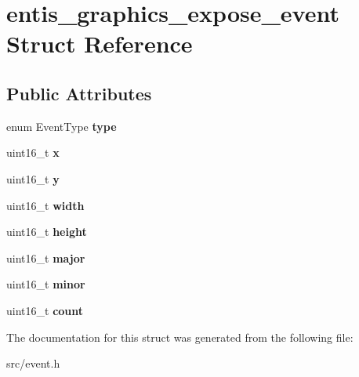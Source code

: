 \hypertarget{structentis__graphics__expose__event}{}\section{entis\+\_\+graphics\+\_\+expose\+\_\+event Struct Reference}
\label{structentis__graphics__expose__event}
\subsection*{Public Attributes}
\begin{DoxyCompactItemize}
\item 
\mbox{\label{structentis__graphics__expose__event_a77150777a48328b11a58cdccb8aee3ad}} 
enum Event\+Type {\bfseries type}
\item 
\mbox{\label{structentis__graphics__expose__event_a64d5a499a952784094cad1e42257deaa}} 
uint16\+\_\+t {\bfseries x}
\item 
\mbox{\label{structentis__graphics__expose__event_a903f76814edb5e7328842dc11942cdd4}} 
uint16\+\_\+t {\bfseries y}
\item 
\mbox{\label{structentis__graphics__expose__event_a9ebe20f07f2cfa70c764d1594480dd60}} 
uint16\+\_\+t {\bfseries width}
\item 
\mbox{\label{structentis__graphics__expose__event_a8533a874f95093b5e2de23f23caffe15}} 
uint16\+\_\+t {\bfseries height}
\item 
\mbox{\label{structentis__graphics__expose__event_a41abf701a0ed8f850ba713817fe76fdf}} 
uint16\+\_\+t {\bfseries major}
\item 
\mbox{\label{structentis__graphics__expose__event_a5333a312e5a43b7982634b31701302de}} 
uint16\+\_\+t {\bfseries minor}
\item 
\mbox{\label{structentis__graphics__expose__event_a852b1c2337c94837666e751a48f4f2b8}} 
uint16\+\_\+t {\bfseries count}
\end{DoxyCompactItemize}


The documentation for this struct was generated from the following file\+:\begin{DoxyCompactItemize}
\item 
src/event.\+h\end{DoxyCompactItemize}
